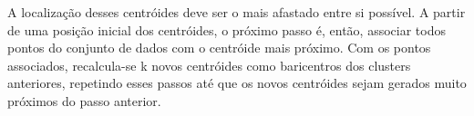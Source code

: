 A localização desses centróides deve ser o mais afastado entre si possível. A partir de uma posição inicial dos centróides, o próximo passo é, então, associar todos pontos do conjunto de dados com o centróide mais próximo. Com os pontos associados, recalcula-se k novos centróides como baricentros dos clusters anteriores, repetindo esses passos até que os novos centróides sejam gerados muito próximos do passo anterior. 




